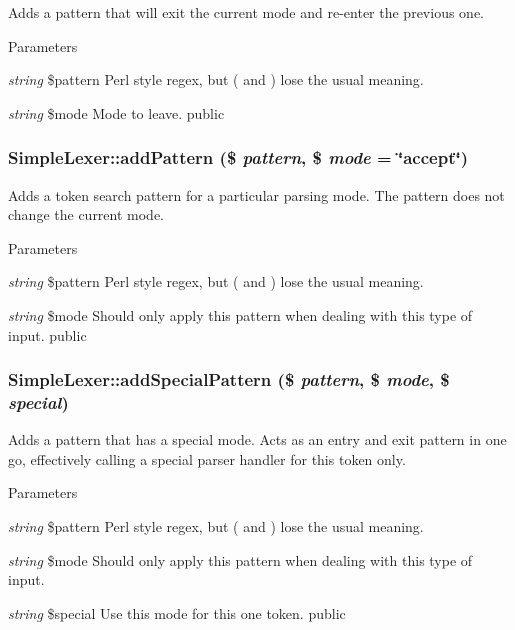 \label{class_simple_lexer_a1cf1b9bc0c1d4b8b3dd465e31a6e1a15}
Adds a pattern that will exit the current mode and re-\/enter the previous one. 
\begin{DoxyParams}{Parameters}
\item[{\em string}]\$pattern Perl style regex, but ( and ) lose the usual meaning. \item[{\em string}]\$mode Mode to leave.  public \end{DoxyParams}
\hypertarget{class_simple_lexer_af0ef334972904054720c4ededafb9a24}{
\subsubsection[{addPattern}]{\setlength{\rightskip}{0pt plus 5cm}SimpleLexer::addPattern (\$ {\em pattern}, \/  \$ {\em mode} = {\ttfamily \char`\"{}accept\char`\"{}})}}
\label{class_simple_lexer_af0ef334972904054720c4ededafb9a24}
Adds a token search pattern for a particular parsing mode. The pattern does not change the current mode. 
\begin{DoxyParams}{Parameters}
\item[{\em string}]\$pattern Perl style regex, but ( and ) lose the usual meaning. \item[{\em string}]\$mode Should only apply this pattern when dealing with this type of input.  public \end{DoxyParams}
\hypertarget{class_simple_lexer_a59d5052dc25de99c53042847e8214c4f}{
\subsubsection[{addSpecialPattern}]{\setlength{\rightskip}{0pt plus 5cm}SimpleLexer::addSpecialPattern (\$ {\em pattern}, \/  \$ {\em mode}, \/  \$ {\em special})}}
\label{class_simple_lexer_a59d5052dc25de99c53042847e8214c4f}
Adds a pattern that has a special mode. Acts as an entry and exit pattern in one go, effectively calling a special parser handler for this token only. 
\begin{DoxyParams}{Parameters}
\item[{\em string}]\$pattern Perl style regex, but ( and ) lose the usual meaning. \item[{\em string}]\$mode Should only apply this pattern when dealing with this type of input. \item[{\em string}]\$special Use this mode for this one token.  public \end{DoxyParams}
